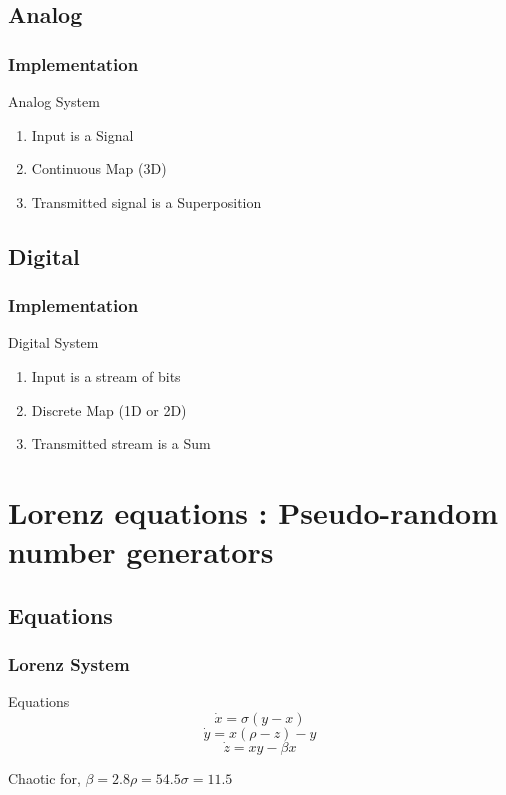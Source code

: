 \documentclass[xcolor=dvipsnames]{beamer}
\begin{document}
\subsection*{Analog}
\begin{frame}
\frametitle{Implementation}
\begin{block}{Analog System}
\end{block}
\begin{enumerate}
\item
Input is a \alert{Signal}
\newline
\item
\alert{Continuous} Map (3D)
\newline
\item
Transmitted signal is a \alert{Superposition}
\newline
\end{enumerate}
\end{frame}

\subsection*{Digital}
\begin{frame}
\frametitle{Implementation}
\begin{block}{Digital System}
\end{block}
\begin{enumerate}
\item
Input is a \alert{stream of bits}
\newline
\item
\alert{Discrete} Map (1D or 2D)
\newline
\item
Transmitted stream  is a \alert{Sum}
\newline
\end{enumerate}
\end{frame}

\section[Lorenz]{Lorenz equations : Pseudo-random number generators}
\subsection*{Equations}
\begin{frame}
\frametitle{Lorenz System}
\begin{block}{Equations}
\begin{equation*}
\dot{x} = \sigma ( y - x )
\end{equation*}
\begin{equation*}
\dot{y} = x ( \rho - z ) - y
\end{equation*}
\begin{equation*}
\dot{z} = xy - \beta x
\end{equation*}
\end{block}
\begin{block}{Chaotic for,}
$\beta = 2.8$\hfill$\rho = 54.5$\hfill$\sigma = 11.5$
\end{block}
\end{frame}
\end{document}

